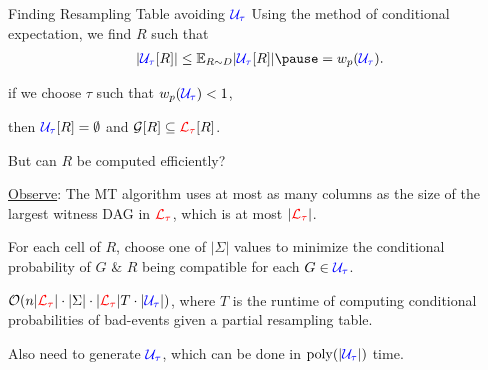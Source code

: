 \documentclass{beamer}
\def\padding{\vspace{0.5cm}}
\def\spadding{\vspace{0.25cm}}
\begin{document}
\begin{frame}{Finding Resampling Table avoiding $\textcolor{blue}{\mathcal{U}_\tau}$}
Using the method of conditional expectation, we find $R$ such that \vspace{-0.5em}\begin{align*}
    |\compat{\U}{R}| \leq \E[R \sim \distr]{|\compat{\U}{R}|} \pause = \w(\U).
\end{align*}\pause

\vspace{-1.8em}\follows if we choose $\tau$ such that $w_p(\textcolor{blue}{\mathcal{U}_\tau}) < 1$,\par then $\textcolor{blue}{\mathcal{U}_\tau}[R] = \emptyset$ and $\mathcal{G}[R] \subseteq \textcolor{red}{\mathcal{L}_\tau}[R]$.\pause\padding

But can $R$ be computed efficiently?\pause\spadding

\underline{Observe}: The MT algorithm uses at most as many columns as the size of the largest witness DAG in $\textcolor{red}{\mathcal{L}_\tau}$\pause, which is at most $|\textcolor{red}{\mathcal{L}_\tau}|$.\pause\spadding

For each cell of $R$, choose one of $|\Sigma|$ values to minimize the conditional probability of $G$ \& $R$ being compatible for each $G \in \textcolor{blue}{\mathcal{U}_\tau}$.\pause\spadding

\follows $\mathcal{O}(n |\textcolor{red}{\mathcal{L}_\tau}| \cdot |\Sigma| \cdot |\textcolor{red}{\mathcal{L}_\tau}| T \cdot |\textcolor{blue}{\mathcal{U}_\tau}|)$\pause, where $T$ is the runtime of computing conditional probabilities of bad-events given a partial resampling table.\pause\par
Also need to generate $\textcolor{blue}{\mathcal{U}_\tau}$, which can be done in $\mathrm{poly}(|\textcolor{blue}{\mathcal{U}_\tau}|)$ time.
\end{frame}
\end{document}
